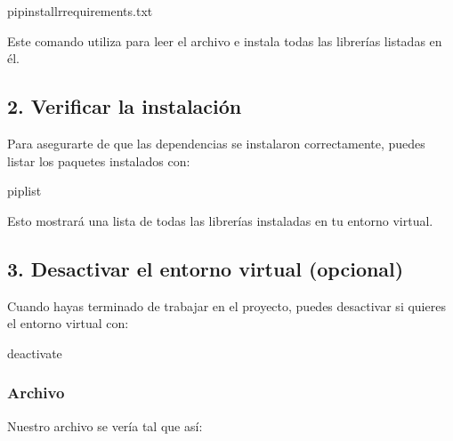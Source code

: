 \documentclass[a4paper,10pt,spanish]{sphinxmanual}
\begin{document}
\begin{sphinxVerbatim}[commandchars=\\\{\}]
pipinstall\PYGZhy{}rrequirements.txt
\end{sphinxVerbatim}

\sphinxAtStartPar
Este comando utiliza  para leer el archivo  e instala todas las librerías listadas en él.


\subsection{2. Verificar la instalación}
\label{\detokenize{configuracion_inicial/002.instalacion_librerias:verificar-la-instalacion}}
\sphinxAtStartPar
Para asegurarte de que las dependencias se instalaron correctamente, puedes listar los paquetes instalados con:

\begin{sphinxVerbatim}[commandchars=\\\{\}]
piplist
\end{sphinxVerbatim}

\sphinxAtStartPar
Esto mostrará una lista de todas las librerías instaladas en tu entorno virtual.


\subsection{3. Desactivar el entorno virtual (opcional)}
\label{\detokenize{configuracion_inicial/002.instalacion_librerias:desactivar-el-entorno-virtual-opcional}}
\sphinxAtStartPar
Cuando hayas terminado de trabajar en el proyecto, puedes desactivar si quieres el entorno virtual con:

\begin{sphinxVerbatim}[commandchars=\\\{\}]
deactivate
\end{sphinxVerbatim}


\subsubsection{Archivo }
\label{\detokenize{configuracion_inicial/002.instalacion_librerias:archivo-requirements-txt}}
\sphinxAtStartPar
Nuestro archivo  se vería tal que así:
\end{document}
